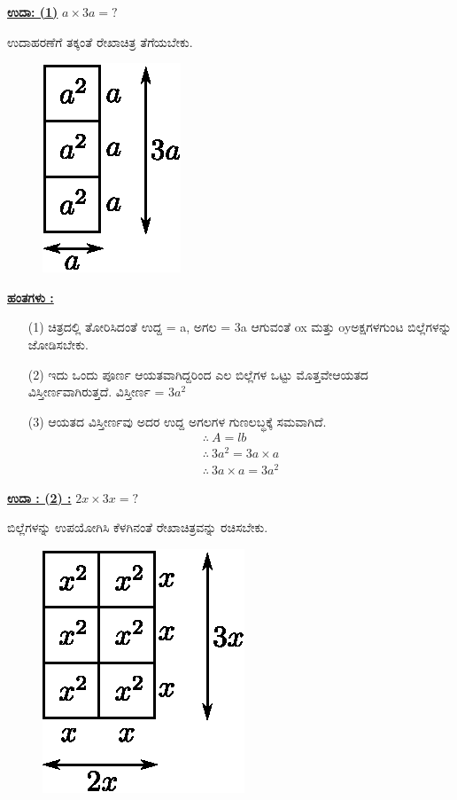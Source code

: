\noindent
{\textbf{\underline{ಉದಾ: (1)}}} $a \times 3a = ?$

ಉದಾಹರಣೆಗೆ ತಕ್ಕಂತೆ ರೇಖಾಚಿತ್ರ ತೆಗೆಯಬೇಕು.
\begin{figure}[H]
\centering
\includegraphics[scale=0.9]{src/figure/chap3/fig3-29a.eps}
\end{figure}

\noindent
{\textbf{\underline{ಹಂತಗಳು :}}}

\begin{itemize}
\item [(1)] ಚಿತ್ರದಲ್ಲಿ ತೋರಿಸಿದಂತೆ ಉದ್ದ = a, ಅಗಲ = 3a ಆಗುವಂತೆ ox ಮತ್ತು oy\break ಅಕ್ಷಗಳಗುಂಟ ಬಿಲ್ಲೆಗಳನ್ನು ಜೋಡಿಸಬೇಕು. 
\item [(2)] ಇದು ಒಂದು ಪೂರ್ಣ ಆಯತವಾಗಿದ್ದರಿಂದ ಎಲ ಬಿಲ್ಲೆಗಳ ಒಟ್ಟು ಮೊತ್ತವೇ\break ಆಯತದ ವಿಸ್ತೀರ್ಣವಾಗಿರುತ್ತದೆ. ವಿಸ್ತೀರ್ಣ = $3a^2$
\item [(3)] ಆಯತದ ವಿಸ್ತೀರ್ಣವು ಅದರ ಉದ್ದ ಅಗಲಗಳ ಗುಣಲಬ್ಧಕ್ಕೆ ಸಮವಾಗಿದೆ. 
\begin{gather*}
\therefore~ A = lb \\
\therefore~ 3a^2 = 3a \times a\\
\therefore~ 3a \times a = 3a^2
\end{gather*}

\end{itemize}

\medskip
\noindent
{\textbf{\underline{ಉದಾ : (2) :}}} $2x \times 3x = ?$

ಬಿಲ್ಲೆಗಳನ್ನು ಉಪಯೋಗಿಸಿ ಕೆಳಗಿನಂತೆ ರೇಖಾಚಿತ್ರವನ್ನು ರಚಿಸಬೇಕು.
\begin{figure}[H]
\centering
\includegraphics[scale=0.9]{src/figure/chap3/fig3-29b.eps}
\end{figure}

